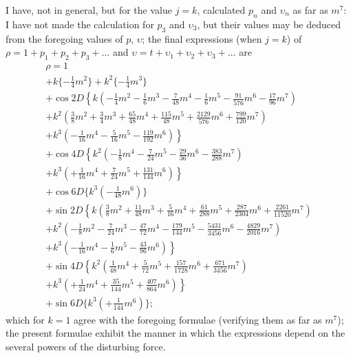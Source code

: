 \documentclass[11pt,a4paper]{article}
\theoremstyle{plain}
\theoremstyle{definition}
\theoremstyle{remark}
\begin{document}
I have, not in general, but for the value $j=k$, calculated $p_{n}$ and $\upsilon_{n}$ as far as $m^{7}$: I have not made the calculation for $p_{3}$ and $\upsilon_{3}$, but their values may be deduced from the foregoing values of $p$, $\upsilon$; the final expressions (when $j=k$) of $\rho=1+p_{1}+p_{2}+p_{3}+\dots$ and $\upsilon=t+\upsilon_{1}+\upsilon_{2}+\upsilon_{3}+\dots$ are
\begin{multline*}
\rho = 1\\
+ k\{-\tfrac14 m^{2}\} + k^{2}\{-\tfrac14 m^{3}\}\\
+ \cos 2D\left\{k(-\tfrac14 m^{2} - \tfrac16 m^{3} - \tfrac{7}{48}m^{4} - \tfrac16 m^{5} - \tfrac{91}{576}m^{6} - \tfrac{17}{96}m^{7})\right.\\
\left. + k^{2}(\tfrac38 m^{2} + \tfrac34 m^{3} + \tfrac{65}{48}m^{4} + \tfrac{115}{48}m^{5} + \tfrac{2129}{576}m^{6} + \tfrac{799}{120}m^{7})\right.\\
\left. + k^{3}(-\tfrac{1}{16}m^{4} - \tfrac{5}{16}m^{5} - \tfrac{119}{192}m^{6})\right\}\\
+ \cos 4D\left\{k^{2}(-\tfrac18 m^{4} - \tfrac{7}{24}m^{5} - \tfrac{29}{36}m^{6} - \tfrac{383}{288}m^{7})\right.\\
\left. + k^{3}(+\tfrac{1}{16}m^{4} + \tfrac{7}{24}m^{5} + \tfrac{131}{144}m^{6})\right\}\\
+ \cos 6D\{k^{3}(-\tfrac{1}{48}m^{6})\}\\
+ \sin 2D\left\{k(\tfrac38 m^{2} + \tfrac{11}{48}m^{3} + \tfrac{5}{16}m^{4} + \tfrac{61}{288}m^{5} + \tfrac{287}{2304}m^{6} + \tfrac{2261}{11520}m^{7})\right.\\
\left. + k^{2}(-\tfrac18 m^{2} - \tfrac{7}{24}m^{3} - \tfrac{47}{72}m^{4} - \tfrac{179}{144}m^{5} - \tfrac{5431}{3456}m^{6} - \tfrac{4829}{2016}m^{7})\right.\\
\left. + k^{3}(-\tfrac{1}{16}m^{4} - \tfrac{1}{6}m^{5} - \tfrac{43}{96}m^{6})\right\}\\
+ \sin 4D\left\{k^{2}(\tfrac{1}{48}m^{4} + \tfrac{5}{72}m^{5} + \tfrac{157}{1728}m^{6} + \tfrac{671}{3456}m^{7})\right.\\
\left. + k^{3}(+\tfrac{1}{24}m^{4} + \tfrac{35}{144}m^{5} + \tfrac{407}{864}m^{6})\right\}\\
+ \sin 6D\{k^{3}(+\tfrac{1}{144}m^{6})\};
\end{multline*}
which for $k=1$ agree with the foregoing formulae (verifying them as far as $m^{7}$); the present formulae exhibit the manner in which the expressions depend on the several powers of the disturbing force.
\end{document}
